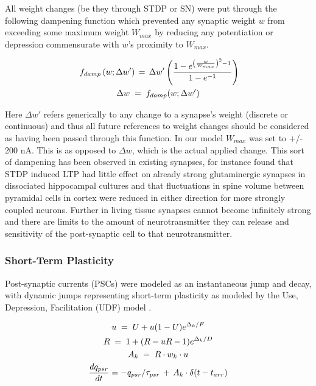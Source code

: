 \documentclass[10pt,letterpaper]{article}
\begin{document}
All weight changes (be they through STDP or SN) were put through the following dampening function which prevented any synaptic weight $w$ from exceeding some maximum weight $W_{max}$ by reducing any potentiation or depression commensurate with $w$'s proximity to $W_{max}$.

\begin{gather} \label{eqn:8}
	\small
	\ f_{damp}\left(w; \Delta w'\right) \,=\, \Delta w'\left(\frac{1-e^{\left(\frac{w}{W_{max}}\right)^2 - 1}}{1-e^{-1}}\right)\\
	\Delta w \;=\; f_{damp}(w; \Delta w') \notag
\end{gather}	
		
Here $\Delta w'$ refers generically to any change to a synapse's weight (discrete or continuous) and thus all future references to weight changes should be considered as having been passed through this function. In our model $W_{max}$ was set to +/- 200 nA. This is as opposed to $\Delta w$, which is the actual applied change. This sort of dampening has been observed in existing synapses, for instance \cite{bi1998synaptic} found that STDP induced LTP had little effect on already strong glutaminergic synapses in dissociated hippocampal cultures and that fluctuations in spine volume between pyramidal cells in cortex were reduced in either direction for more strongly coupled neurons. Further in living tissue synapses cannot become infinitely strong and there are limits to the amount of neurotransmitter they can release and sensitivity of the post-synaptic cell to that neurotransmitter.		
		
\subsubsection*{Short-Term Plasticity}

Post-synaptic currents (PSCs) were modeled as an instantaneous jump and decay, with dynamic jumps representing short-term plasticity as modeled by the Use, Depression, Facilitation (UDF) model \cite{markram1998differential}.

\begin{gather}
u \;=\; U + u(1-U)e^{\Delta_k/F}  \\
R \;=\; 1 + (R - uR - 1)e^{\Delta_k/D} \notag \\
A_k \;=\; R \cdot w_k \cdot u\notag \\
\frac{dq_{psr}}{dt} = -q_{psr}/\tau_{psr} \,+\, A_k\cdot\delta(t - t_{arr}) \notag 
\end{gather}
\end{document}
